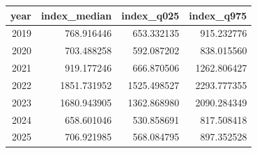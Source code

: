 \begin{tabular}{rrrr}
\toprule
year & index\_median & index\_q025 & index\_q975 \\
\midrule
2019 & 768.916446 & 653.332135 & 915.232776 \\
2020 & 703.488258 & 592.087202 & 838.015560 \\
2021 & 919.177246 & 666.870506 & 1262.806427 \\
2022 & 1851.731952 & 1525.498527 & 2293.777355 \\
2023 & 1680.943905 & 1362.868980 & 2090.284349 \\
2024 & 658.601046 & 530.858691 & 817.508418 \\
2025 & 706.921985 & 568.084795 & 897.352528 \\
\bottomrule
\end{tabular}

